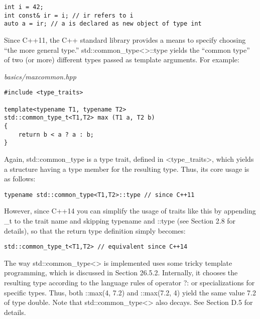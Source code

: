 \begin{lstlisting}[style=styleCXX]
int i = 42;
int const& ir = i; // ir refers to i
auto a = ir; // a is declared as new object of type int
\end{lstlisting}


Since C++11, the C++ standard library provides a means to specify choosing “the more general type.” std::common\_type<>::type yields the “common type” of two (or more) different types passed as template arguments. For example:

\noindent
\textit{basics/maxcommon.hpp}
\begin{lstlisting}[style=styleCXX]
#include <type_traits>

template<typename T1, typename T2>
std::common_type_t<T1,T2> max (T1 a, T2 b)
{
	return b < a ? a : b;
}
\end{lstlisting}

Again, std::common\_type is a type trait, defined in <type\_traits>, which yields a structure having a type member for the resulting type. Thus, its core usage is as follows:

\begin{lstlisting}[style=styleCXX]
typename std::common_type<T1,T2>::type // since C++11
\end{lstlisting}

However, since C++14 you can simplify the usage of traits like this by appending \_t to the trait name and skipping typename and ::type (see Section 2.8 for details), so that the return type definition simply becomes:

\begin{lstlisting}[style=styleCXX]
std::common_type_t<T1,T2> // equivalent since C++14
\end{lstlisting}

The way std::common\_type<> is implemented uses some tricky template programming, which is discussed in Section 26.5.2. Internally, it chooses the resulting type according to the language rules of operator ?: or specializations for specific types. Thus, both ::max(4, 7.2) and ::max(7.2, 4) yield the same value 7.2 of type double. Note that std::common\_type<> also decays. See Section D.5 for details.




